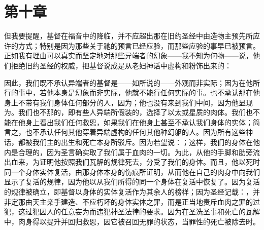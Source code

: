 
\section{第十章}

\par

但我要提醒，基督在福音中的降临，并不应超出那在旧约圣经中由造物主预先所应许的方式；特别是因为那些关于祂的预言已经应验，而那些应验的事早已被预言。正如我有理由可以真实而坚定地对那些异端者的幻象——我不知为何物——说，他们拒绝旧约圣经的权威，把基督说成是从老妇神话中虚构和粉饰出来的：\par

因此，我们既不承认异端者的基督是——如所说的——外观而非实际；因为在他所行的事中，若他本身是幻象而非实际，他就不能行任何实际的事。也不承认那在他身上不带有我们身体任何部分的人，因为；他也没有来到我们中间，因为他显现为。我们也不那的，即有些人异端所假装的，选择了以太或星质的肉体。我们也不能在他身上看出我们任何救恩，如果我们在他身上甚至不承认我们身体的实体；简言之，也不承认任何其他穿着异端虚构的任何其他种幻躯的人。因为所有这些神话，都被我们主的出生和死亡本身所驳斥。因为若望说：；这样，我们的身体在他内是合理的，因为圣言确实取了我们属于血肉的一切。为此，从他的手脚和肋旁流出血来，为证明他按照我们瓦解的规律死去，分受了我们的身体。而且，他以死时同一个身体实体复活，由那身体本身的伤痕所证明，从而他在自己的肉身中向我们显示了复活的规律，因为他以从我们所得的同一个身体在复活中恢复了。因为复活的规律被确立，即基督以身体的实体复活作为其余人的榜样；因为圣经记载：，并非定那由天主亲手建造、不应朽坏的身体实体之罪，而是正当地责斥血肉之罪的过犯，这过犯因人的任意妄为而违犯神圣法律的要求。因为在圣洗圣事和死亡的瓦解中，肉身得以提升并回归救恩，因它被召回无罪的状态，当罪性的死亡被除去时。\par

